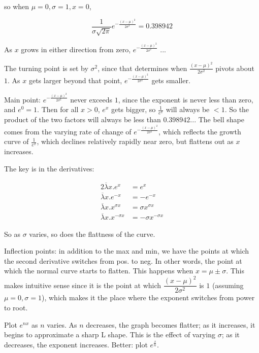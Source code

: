 so when $\mu=0, \sigma=1, x=0$,

\begin{equation}
  \frac{1}{\sigma\sqrt{2\pi}}e^{-\frac{(x-\mu)^2}{2\sigma^2}} = 0.398942
\end{equation}

As $x$ grows in either direction from zero, $e^{-\frac{(x-\mu)^2}{2\sigma^2}}$ ...

The turning point is set by $\sigma^2$, since that determines when
$\frac{(x-\mu)^2}{2\sigma^2}$ pivots about $1$.  As $x$ gets larger beyond that point,
$e^{-\frac{(x-\mu)^2}{2\sigma^2}}$ gets smaller.

Main point: $e^{-\frac{(x-\mu)^2}{2\sigma^2}}$ never exceeds $1$,
since the exponent is never less than zero, and $e^0=1$. Then for all
$x>0$, $e^x$ gets bigger, so $\frac{1}{e^x}$ will always be $<1$.  So
the product of the two factors will always be less than $0.398942...$
The bell shape comes from the varying rate of change of
$e^{-\frac{(x-\mu)^2}{2\sigma^2}}$, which reflects the growth curve of
$\frac{1}{e^x}$, which declines relatively rapidly near zero, but
flattens out as $x$ increases.

The key is in the derivatives:

{
  \begin{alignat}{2}
  \overline{\lambda}x.{e^{x}} &= e^{x} \\
  \overline{\lambda}x.{e^{-x}} &= -e^{-x} \\
  \overline{\lambda}x.x^{\sigma x} &= \sigma x^{\sigma x} \\
  \overline{\lambda}x.x^{-\sigma x} &= -\sigma x^{-\sigma x}
  \end{alignat}
}

So as $\sigma$ varies, so does the flattness of the curve.

\begin{remark}
  Inflection points: in addition to the max and min, we have the
  points at which the second derivative switches from pos. to neg.  In
  other words, the point at which the normal curve starts to flatten.
  This happens when $x=\mu\pm\sigma$.  This makes intuitive sense
  since it is the point at which $\dfrac{(x-\mu)^2}{2\sigma^2}$ is $1$
  (assuming $\mu=0, \sigma=1$), which makes it the place where the
  exponent switches from power to root.
\end{remark}

\begin{remark}
  Plot $e^{nx}$ as $n$ varies.  As $n$ decreases, the graph becomes
  flatter; as it increases, it begins to approximate a sharp L shape.
  This is the effect of varying $\sigma$; as it decreases, the
  exponent increases.  Better: plot $e^{\frac{x}{n}}$.
\end{remark}


